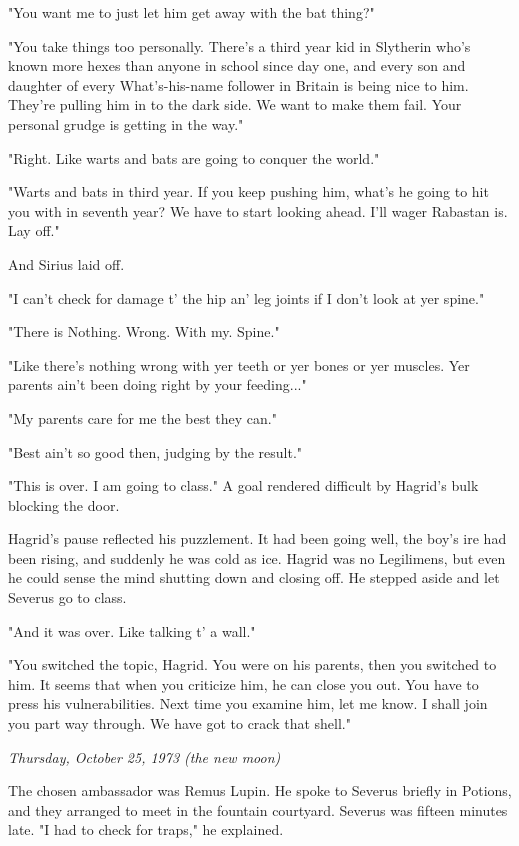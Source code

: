 \documentclass[a4paper,11pt]{article}
\begin{document}
"You want me to just let him get away with the bat thing?"

"You take things too personally. There's a third year kid in Slytherin who's known more hexes than anyone in school since day one, and every son and daughter of every What's-his-name follower in Britain is being nice to him. They're pulling him in to the dark side. We want to make them fail. Your personal grudge is getting in the way."

"Right. Like warts and bats are going to conquer the world."

"Warts and bats in third year. If you keep pushing him, what's he going to hit you with in seventh year? We have to start looking ahead. I'll wager Rabastan is. Lay off."

And Sirius laid off.

"I can't check for damage t' the hip an' leg joints if I don't look at yer spine."

"There is Nothing. Wrong. With my. Spine."

"Like there's nothing wrong with yer teeth or yer bones or yer muscles. Yer parents ain't been doing right by your feeding..."

"My parents care for me the best they can."

"Best ain't so good then, judging by the result."

"This is over. I am going to class." A goal rendered difficult by Hagrid's bulk blocking the door.

Hagrid's pause reflected his puzzlement. It had been going well, the boy's ire had been rising, and suddenly he was cold as ice. Hagrid was no Legilimens, but even he could sense the mind shutting down and closing off. He stepped aside and let Severus go to class.

"And it was over. Like talking t' a wall."

"You switched the topic, Hagrid. You were on his parents, then you switched to him. It seems that when you criticize him, he can close you out. You have to press his vulnerabilities. Next time you examine him, let me know. I shall join you part way through. We have got to crack that shell."

\emph{Thursday, October 25, 1973 (the new moon)}

The chosen ambassador was Remus Lupin. He spoke to Severus briefly in Potions, and they arranged to meet in the fountain courtyard. Severus was fifteen minutes late. "I had to check for traps," he explained.
\end{document}
